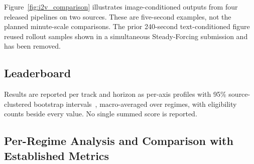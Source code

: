 

Figure~\ref{fig:i2v_comparison} illustrates image-conditioned outputs from four released pipelines on two sources. These are five-second examples, not the planned minute-scale comparisons. The prior 240-second text-conditioned figure reused rollout samples shown in a simultaneous Steady-Forcing submission and has been removed. 

\subsection{Leaderboard}
Results are reported per track and horizon as per-axis profiles with 95\% source-clustered bootstrap intervals~\cite{efron1979bootstrap}, macro-averaged over regimes, with eligibility counts beside every value. No single summed score is reported. 

\subsection{Per-Regime Analysis and Comparison with Established Metrics}

